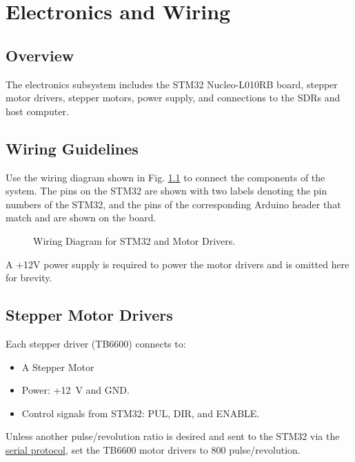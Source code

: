 \chapter{Electronics and Wiring}

\section{Overview}

The electronics subsystem includes the STM32 Nucleo-L010RB board, stepper motor drivers, stepper motors, power supply, and connections to the SDRs and host computer.

\section{Wiring Guidelines}

Use the wiring diagram shown in Fig. \ref{fig:wiring} to connect the components of the system.
The pins on the STM32 are shown with two labels denoting the pin numbers of the STM32, and the pins
of the corresponding Arduino header that match and are shown on the board.

\begin{figure}[h!]
    \footnotesize
    \begin{centering}
    
    \end{centering}
    \caption{Wiring Diagram for STM32 and Motor Drivers.}
    \label{fig:wiring}
\end{figure}

A +12V power supply is required to power the motor drivers and is omitted here for brevity.

\section{Stepper Motor Drivers}

Each stepper driver (TB6600) connects to:
\begin{itemize}
  \item A Stepper Motor
  \item Power: +12~V and GND.
  \item Control signals from STM32: PUL, DIR, and ENABLE.
\end{itemize}

Unless another pulse/revolution ratio is desired and sent to the STM32 via the \hyperref[sec:serial_protocol]{serial protocol},
set the TB6600 motor drivers to 800 pulse/revolution.



